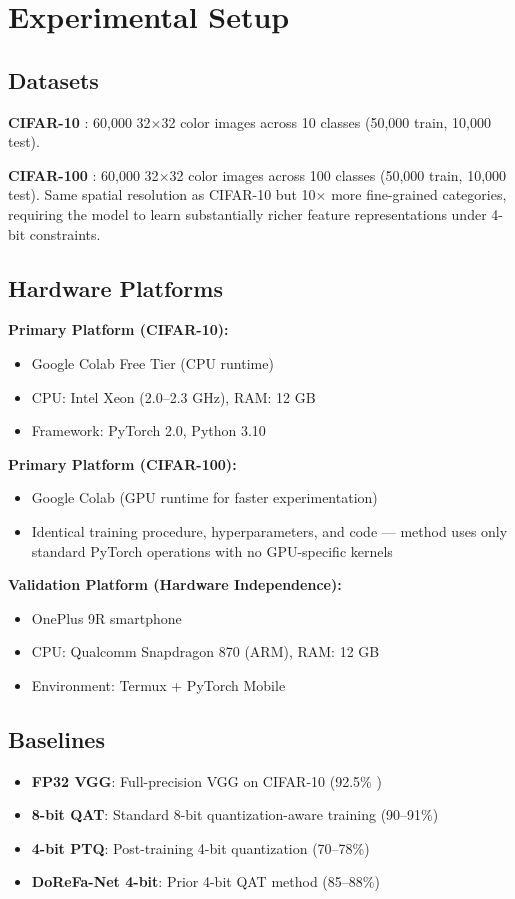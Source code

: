 \documentclass[conference]{IEEEtran}
\begin{document}
\section{Experimental Setup}

\subsection{Datasets}
\textbf{CIFAR-10} \cite{krizhevsky2009learning}: 60,000 32$\times$32 color images across 10 classes (50,000 train, 10,000 test).

\textbf{CIFAR-100} \cite{krizhevsky2009learning}: 60,000 32$\times$32 color images across 100 classes (50,000 train, 10,000 test). Same spatial resolution as CIFAR-10 but 10$\times$ more fine-grained categories, requiring the model to learn substantially richer feature representations under 4-bit constraints.

\subsection{Hardware Platforms}
\textbf{Primary Platform (CIFAR-10):}
\begin{itemize}
    \item Google Colab Free Tier (CPU runtime)
    \item CPU: Intel Xeon (2.0--2.3 GHz), RAM: 12 GB
    \item Framework: PyTorch 2.0, Python 3.10
\end{itemize}

\textbf{Primary Platform (CIFAR-100):}
\begin{itemize}
    \item Google Colab (GPU runtime for faster experimentation)
    \item Identical training procedure, hyperparameters, and code --- method uses only standard PyTorch operations with no GPU-specific kernels
\end{itemize}

\textbf{Validation Platform (Hardware Independence):}
\begin{itemize}
    \item OnePlus 9R smartphone
    \item CPU: Qualcomm Snapdragon 870 (ARM), RAM: 12 GB
    \item Environment: Termux + PyTorch Mobile
\end{itemize}

\subsection{Baselines}
\begin{itemize}
    \item \textbf{FP32 VGG}: Full-precision VGG on CIFAR-10 (92.5\% \cite{simonyan2014very})
    \item \textbf{8-bit QAT}: Standard 8-bit quantization-aware training (90--91\%)
    \item \textbf{4-bit PTQ}: Post-training 4-bit quantization (70--78\%)
    \item \textbf{DoReFa-Net 4-bit}: Prior 4-bit QAT method (85--88\%)
\end{itemize}
\end{document}
